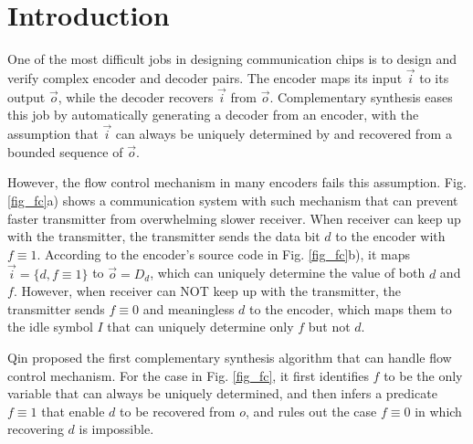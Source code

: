\documentclass[conference]{IEEEtran}
\begin{document}
\section{Introduction}\label{sec_intro}
One of the most difficult jobs in designing communication
 chips is to design and verify complex encoder and decoder pairs.
The encoder maps its input $\vec{i}$ to its output  $\vec{o}$,
while the decoder recovers $\vec{i}$ from $\vec{o}$.
Complementary synthesis 
\cite{ShenICCAD09,ShenTCAD11,ShenTCAD12,LiuICCAD11,LiuTCAD12,TuDAC13}
eases this job by
automatically generating a decoder from an encoder,
with the assumption that $\vec{i}$ can always be
uniquely determined by and recovered from a bounded sequence of $\vec{o}$.

However,
the flow control mechanism \cite{flowcontrol} in many encoders
fails this assumption.
Fig. \ref{fig_fc}a) shows a communication system with such mechanism 
that can prevent faster transmitter from overwhelming slower receiver.
When receiver can keep up with the transmitter,
the transmitter sends the data bit $d$ to the encoder with $f\equiv 1$.
According to the encoder's source code in Fig. \ref{fig_fc}b),
it maps $\vec{i}=\{d,f\equiv 1\}$ to $\vec{o}=D_d$,
which can uniquely determine the value of both $d$ and $f$.
However,
when receiver can NOT keep up with the transmitter,
the transmitter sends $f\equiv 0$ and meaningless $d$ to the encoder,
which maps them to the idle symbol $I$ that can uniquely determine only $f$ but not $d$.

Qin\cite{QinTODAES15} proposed the first complementary synthesis algorithm 
that can handle flow control mechanism.
For the case in Fig. \ref{fig_fc},
it first identifies $f$ to be the only variable that can always be uniquely determined,
and then infers a predicate $f\equiv 1$ that
enable $d$ to be recovered from $o$,
and rules out the case $f\equiv 0$ in which recovering $d$ is impossible.
\end{document}
